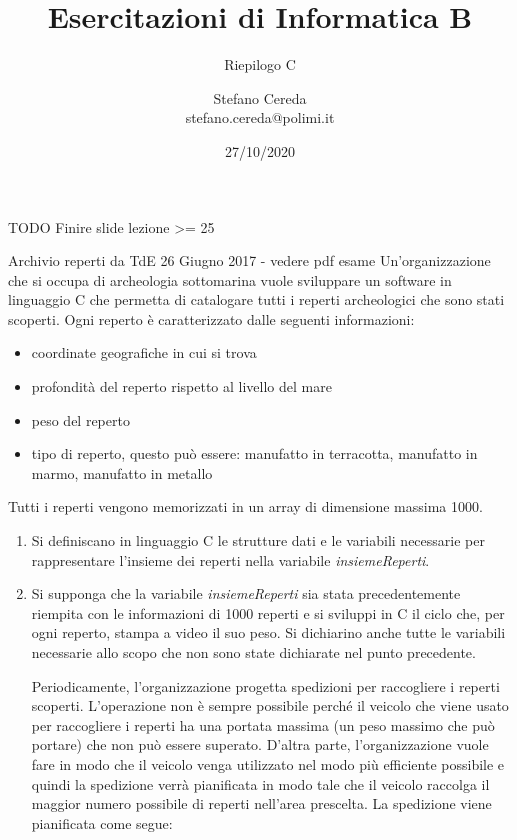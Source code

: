 \documentclass[aspectratio=169,]{beamer}
\title{Esercitazioni di Informatica B}
\subtitle{Riepilogo C}
\author{Stefano Cereda\\
stefano.cereda@polimi.it
}
\date{27/10/2020}
\institute[PoliMi]{Politecnico Milano}
\begin{document}
\begin{frame}
    \maketitle
\end{frame}

\begin{frame}{TODO}
    Finire slide lezione >= 25
\end{frame}

\begin{frame}[allowframebreaks]{Archivio reperti da TdE 26 Giugno 2017 - vedere pdf esame}
    Un’organizzazione che si occupa di archeologia sottomarina vuole sviluppare un software in linguaggio C
    che permetta di catalogare tutti i reperti archeologici che sono stati scoperti. Ogni reperto è caratterizzato
    dalle seguenti informazioni:
    \begin{itemize}
        \item coordinate geografiche in cui si trova
        \item profondità del reperto rispetto al livello del mare
        \item  peso del reperto
        \item  tipo di reperto, questo può essere: manufatto in terracotta, manufatto in marmo, manufatto in metallo
    \end{itemize}
    Tutti i reperti vengono memorizzati in un array di dimensione massima 1000.

    \begin{enumerate}
        \item Si definiscano in linguaggio C le strutture dati e le variabili necessarie per rappresentare l’insieme dei
            reperti nella variabile \emph{insiemeReperti}.
        \item  Si supponga che la variabile \emph{insiemeReperti} sia stata precedentemente riempita con le informazioni
            di 1000 reperti e si sviluppi in C il ciclo che, per ogni reperto, stampa a video il suo peso. Si dichiarino
            anche tutte le variabili necessarie allo scopo che non sono state dichiarate nel punto precedente.

            Periodicamente, l’organizzazione progetta spedizioni per raccogliere i reperti scoperti. L’operazione non è
            sempre possibile perché il veicolo che viene usato per raccogliere i reperti ha una portata massima (un peso
            massimo che può portare) che non può essere superato. D’altra parte, l’organizzazione vuole fare in modo
            che il veicolo venga utilizzato nel modo più efficiente possibile e quindi la spedizione verrà pianificata in
            modo tale che il veicolo raccolga il maggior numero possibile di reperti nell'area prescelta. La spedizione
            viene pianificata come segue:


\end{enumerate}
\end{frame}
\end{document}
